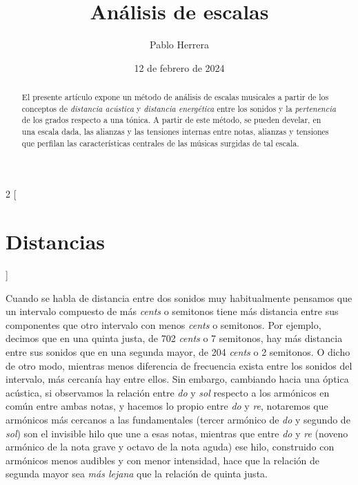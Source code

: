 \documentclass[a4paper,11pt]{article}
\begin{document}
\title{Análisis de escalas}
\author{Pablo Herrera}
\date{12 de febrero de 2024}
\maketitle
\begin{abstract}
El presente artículo expone un método de análisis de escalas musicales a partir de los conceptos de \emph{distancia acústica} y \emph{distancia energética} entre los sonidos y la \emph{pertenencia} de los grados respecto a una tónica. A partir de este método, se pueden develar, en una escala dada, las alianzas y las tensiones internas entre notas, alianzas y tensiones que perfilan las  características centrales de las músicas surgidas de tal escala.
\end{abstract}
\tableofcontents
\newpage
\begin{multicols}{2}
[\section{Distancias}\label{sec:distancias}]

  Cuando se habla de distancia entre dos sonidos muy habitualmente pensamos que un intervalo compuesto de más \emph{cents} o semitonos tiene más distancia entre sus componentes que otro intervalo con menos \emph{cents} o semitonos. Por ejemplo, decimos que en una quinta justa, de 702 \emph{cents} o 7 semitonos, hay más distancia entre sus sonidos que en una segunda mayor, de 204 \emph{cents} o 2 semitonos. O dicho de otro modo, mientras menos diferencia de frecuencia exista entre los sonidos del intervalo, más cercanía hay entre ellos. Sin embargo, cambiando hacia una óptica acústica, si observamos la relación entre \emph{do} y \emph{sol} respecto a los armónicos en común entre ambas notas, y hacemos lo propio entre \emph{do} y \emph{re}, notaremos que armónicos más cercanos a las fundamentales (tercer armónico de \emph{do} y segundo de \emph{sol}) son el invisible hilo que une a esas notas, mientras que entre \emph{do} y \emph{re} (noveno armónico de la nota grave y octavo de la nota aguda) ese hilo, construido con armónicos menos audibles y con menor intensidad, hace que la relación de segunda mayor sea \emph{más lejana} que la relación de quinta justa.


\end{multicols}
\end{document}
